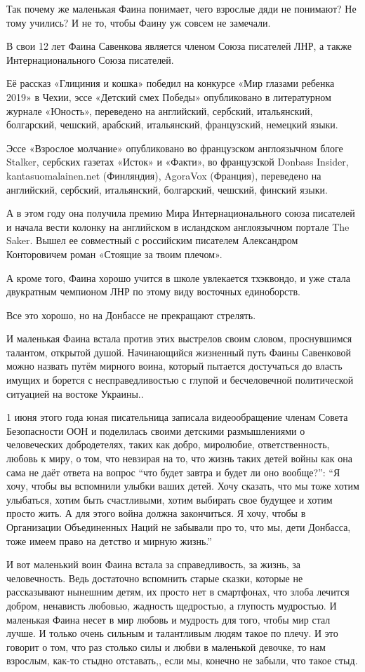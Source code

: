 Так почему же маленькая Фаина понимает, чего взрослые дяди не понимают? Не тому
учились? И не то, чтобы Фаину уж совсем не замечали.

В свои 12 лет Фаина Савенкова является членом Союза писателей ЛНР, а также
Интернационального Союза писателей.

Её рассказ «Глициния и кошка» победил на конкурсе «Мир глазами ребенка 2019» в
Чехии, эссе «Детский смех Победы» опубликовано в литературном журнале «Юность»,
переведено на английский, сербский, итальянский, болгарский, чешский, арабский,
итальянский, французский, немецкий языки.

Эссе «Взрослое молчание» опубликовано во французском англоязычном блоге
Stalker, сербских газетах «Исток» и «Факти», во французской Donbass Insider,
kantasuomalainen.net (Финляндия), AgoraVox (Франция), переведено на английский,
сербский, итальянский, болгарский, чешский, финский языки.

А в этом году она получила премию Мира Интернационального союза писателей и
начала вести колонку на английском в исландском англоязычном портале The Saker.
Вышел ее совместный с российским писателем Александром Конторовичем роман
«Стоящие за твоим плечом».

А кроме того, Фаина хорошо учится в школе увлекается тхэквондо, и уже стала
двукратным чемпионом ЛНР по этому виду восточных единоборств. 

Все это хорошо, но на Донбассе не прекращают стрелять. 

И маленькая Фаина встала против этих выстрелов своим словом, проснувшимся
талантом, открытой душой. Начинающийся жизненный путь Фаины Савенковой можно
назвать путём мирного воина, который пытается достучаться до власть имущих и
борется с несправедливостью с глупой и бесчеловечной политической ситуацией на
востоке Украины..

1 июня этого года юная писательница записала видеообращение членам Совета
Безопасности ООН и поделилась своими детскими размышлениями о человеческих
добродетелях, таких как добро, миролюбие, ответственность, любовь к миру, о
том, что невзирая на то, что жизнь таких детей войны как она сама не даёт
ответа на вопрос \enquote{что будет завтра и будет ли оно вообще?}: \enquote{Я хочу, чтобы вы
вспомнили улыбки ваших детей. Хочу сказать, что мы тоже хотим улыбаться, хотим
быть счастливыми, хотим выбирать свое будущее и хотим просто жить. А для этого
война должна закончиться. Я хочу, чтобы в Организации Объединенных Наций не
забывали про то, что мы, дети Донбасса, тоже имеем право на детство и мирную
жизнь.}

И вот маленький воин Фаина встала за справедливость, за жизнь, за человечность.
Ведь достаточно вспомнить старые сказки, которые не рассказывают нынешним
детям, их просто нет в смартфонах, что злоба лечится добром, ненависть любовью,
жадность щедростью, а глупость мудростью. И маленькая Фаина несет в мир любовь
и мудрость для того, чтобы мир стал лучше. И только очень сильным и талантливым
людям такое по плечу. И это говорит о том, что раз столько силы и любви в
маленькой девочке, то нам взрослым, как-то стыдно отставать,, если мы, конечно
не забыли, что такое стыд.
